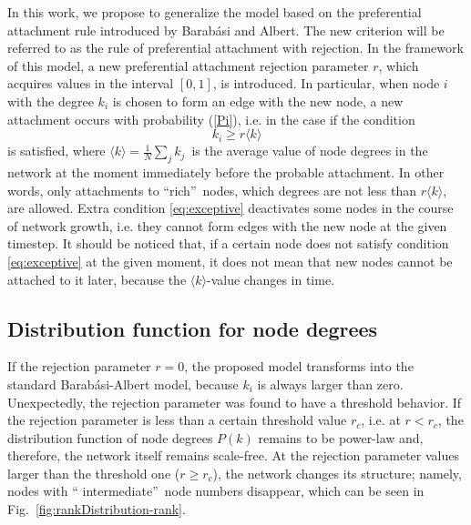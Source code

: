 \documentclass[aps,preprint]{revtex4}%
\begin{document}
In this work, we propose to generalize the model based on the preferential
attachment rule introduced by Barab\'{a}si and Albert. The new criterion will
be referred to as the rule of preferential attachment with rejection. In the
framework of this model, a new preferential attachment rejection parameter
$r$, which acquires values in the interval $[0,1]$, is introduced. In
particular, when node $i$ with the degree $k_{i}$ is chosen to form an edge
with the new node, a new attachment occurs with probability (\ref{Pi}), i.e.
in the case if the condition
\begin{equation}
k_{i}\geq r\langle k\rangle\label{eq:exceptive}%
\end{equation}
is satisfied, where $\langle k\rangle=\frac{1}{N}\sum\nolimits_{j}{k_{j}}$\ is
the average value of node degrees in the network at the moment immediately
before the probable attachment. In other words, only attachments to
\textquotedblleft rich\textquotedblright\ nodes, which degrees are not less
than $r\langle k\rangle$, are allowed. Extra condition \eqref{eq:exceptive}
deactivates some nodes in the course of network growth, i.e. they cannot form
edges with the new node at the given timestep. It should be noticed that, if a
certain node does not satisfy condition \eqref{eq:exceptive} at the given
moment, it does not mean that new nodes cannot be attached to it later,
because the $\langle k\rangle$-value changes in time.

\subsection{Distribution function for node degrees}

If the rejection parameter $r=0$, the proposed model transforms into the
standard Barab\'{a}si-Albert model, because $k_{i}$ is always larger than
zero. Unexpectedly, the rejection parameter was found to have a threshold
behavior. If the rejection parameter is less than a certain threshold value
$r_{c}$, i.e. at $r<r_{c}$, the distribution function of node degrees $P(k)$
remains to be power-law and, therefore, the network itself remains scale-free.
At the rejection parameter values larger than the threshold one ($r\geq r_{c}%
$), the network changes its structure; namely, nodes with \textquotedblleft
intermediate\textquotedblright\ node numbers disappear, which can be seen in
Fig.~\ref{fig:rankDistribution-rank}.
\end{document}
